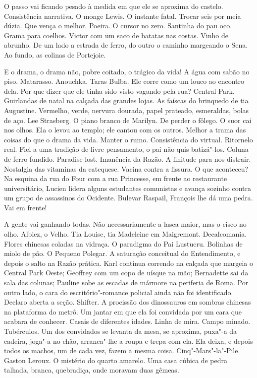 O passo vai ficando pesado à medida em que ele se aproxima do castelo.
Consistência narrativa. O monge Lewis. O instante fatal. Trocar seis por
meia dúzia. Que vença o melhor. Poeira. O cursor no zero. Santinha do
pau oco. Grama para coelhos. Victor com um saco de batatas nas costas.
Vinho de abrunho. De um lado a estrada de ferro, do outro o caminho
margeando o Sena. Ao fundo, as colinas de Portejoie.

E o drama, o drama não, pobre coitado, o trágico da vida! A água com
sabão no piso. Matarasso. Anouchka. Taras Bulba. Ele corre como um louco
ao encontro dela. Por que dizer que ele tinha sido visto vagando pela
rua? Central Park. Guirlandas de natal na calçada das grandes lojas. As
faíscas do brinquedo de tia Augustine. Vermelho, verde, nervura dourada,
papel prateado, esmeraldas, bolas de aço. Lee Strasberg. O piano branco
de Marilyn. De perder o fôlego. O suor cai nos olhos. Ela o levou ao
templo; ele cantou com os outros. Melhor a trama das coisas do que o
drama da vida. Manter o rumo. Consistência do virtual. Ritornelo real.
Fiel a uma tradição de livre pensamento, o pai não quis batizá"-los.
Coluna de ferro fundido. Paradise lost. Imanência da Razão. A finitude
para nos distrair. Nostalgia das vitaminas da catequese. Vacina contra a
fissura. O que aconteceu? Na esquina da rua do Four com a rua Princesse,
em frente ao restaurante universitário, Lucien lidera alguns estudantes
comunistas e avança sozinho contra um grupo de assassinos do Ocidente.
Bulevar Raspail, François lhe dá uma pedra. Vai em frente!

A gente vai ganhando todas. Não necessariamente a lasca maior, mas o
cisco no olho. Albiez, o Velho. Tia Louise, tia Madeleine em Maigremont.
Decalcomania. Flores chinesas coladas na vidraça. O paradigma do Pai
Lustucru. Bolinhas de miolo de pão. O Pequeno Polegar. A saturação
conceitual do Entendimento, e depois o salto na Razão prática. Karl
continua correndo na calçada que margeia o Central Park Oeste; Geoffrey
com um copo de uísque na mão; Bernadette sai da sala das colunas;
Pauline sobe as escadas de mármore na periferia de Roma. Por outro lado,
o cara do escritório"-romance policial ainda não foi identificado.
Declaro aberta a seção. Shifter. A procissão dos dinossauros em sombras
chinesas na plataforma do metrô. Um jantar em que ela foi convidada por
um cara que acabara de conhecer. Casais de diferentes idades. Linha de
mira. Campo minado. Tubérculos. Um dos convidados se levanta da mesa, se
aproxima, puxa"-a da cadeira, joga"-a no chão, arranca"-lhe a roupa e trepa
com ela. Ela deixa, e depois todos os machos, um de cada vez, fazem a
mesma coisa. Cinq"-Mars"-la"-Pile. Gaston Leroux. O mistério do quarto
amarelo. Uma casa cúbica de pedra talhada, branca, quebradiça, onde
moravam duas gêmeas.

